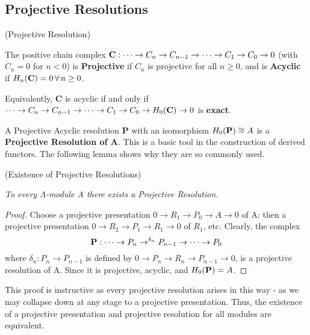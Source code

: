 \subsection{Projective Resolutions}\label{df1.3}
\begin{definition}(Projective Resolution\label{df1.3.1})

The positive chain complex $\textbf C:\dots\rightarrow
C_n\rightarrow C_{n-1} \rightarrow \dots \rightarrow C_1
\rightarrow C_0 \rightarrow 0$ (with $C_n = 0$ for $n<0$) is
\textbf{Projective} if $C_n$ is projective for all $n\geq 0$, and
is \textbf{Acyclic} if $H_n(\textbf C) = 0 \,\forall\, n\geq 0$.

Equivalently, \textbf C is acyclic if and only if
$\dots\rightarrow C_n\rightarrow C_{n-1}\rightarrow \dots
\rightarrow C_1\rightarrow C_0 \rightarrow H_0(\textbf C)
\rightarrow 0$ is \textbf{exact}.

A Projective Acyclic resolution \textbf P with an isomorphism
$H_0(\textbf P) \cong A$ is a \textbf{Projective Resolution of A}.
This is a basic tool in the construction of derived functors. The
following lemma shows why they are so commonly used.

\end{definition}

\begin{lemma}(Existence of Projective Resolutions\label{df1.3.2})

\emph{To every $\Lambda$-module A there exists a Projective
Resolution.}
\end{lemma}

\begin{proof}
Choose a projective presentation $0\rightarrow R_1\rightarrow P_0
\rightarrow A\rightarrow 0$ of A: then a projective presentation
$0\rightarrow R_2 \rightarrow P_1\rightarrow R_1\rightarrow 0$ of
$R_1$, etc. Clearly, the complex
$$\textbf P:\dots \rightarrow P_n\rightarrow^{\delta_n} P_{n-1}
\rightarrow \dots \rightarrow P_0$$ where $\delta_n:P_n\rightarrow
P_{n-1}$ is defined by $0\rightarrow P_n \rightarrow R_n
\rightarrow P_{n-1}\rightarrow 0$, is a projective resolution of
A. Since it is projective, acyclic, and $H_0(\textbf P) = A$.
\end{proof}

This proof is instructive as every projective resolution arises in
this way - as we may collapse down at any stage to a projective
presentation. Thus, the existence of a projective presentation and
projective resolution for all modules are equivalent.


